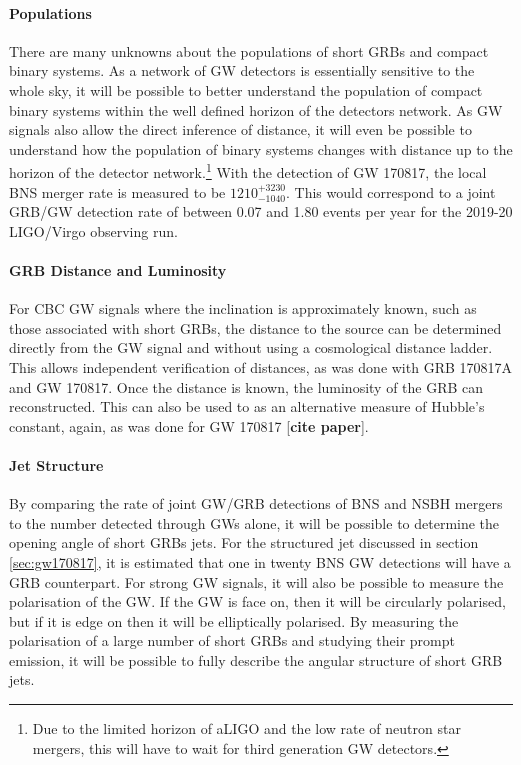 \documentclass[11pt]{cuthesis}
\begin{document}
\paragraph{Populations}
There are many unknowns about the populations of short GRBs and compact binary systems. As a network of GW detectors is essentially sensitive to the whole sky, it will be possible to better understand the population of compact binary systems within the well defined horizon of the detectors network. As GW signals also allow the direct inference of distance, it will even be possible to understand how the population of binary systems changes with distance up to the horizon of the detector network.\footnote{Due to the limited horizon of aLIGO and the low rate of neutron star mergers, this will have to wait for third generation GW detectors.} With the detection of GW 170817, the local BNS merger rate is measured to be $1210^{+3230}_{-1040}$.\cite{catalog} This would correspond to a joint GRB/GW detection rate of between 0.07 and 1.80 events per year for the 2019-20 LIGO/Virgo observing run.\cite{GW170817_GRB} 

\paragraph{GRB Distance and Luminosity}
For CBC GW signals where the inclination is approximately known, such as those associated with short GRBs, the distance to the source can be determined directly from the GW signal and without using a cosmological distance ladder. This allows independent verification of distances, as was done with GRB 170817A and GW 170817. Once the distance is known, the luminosity of the GRB can reconstructed. This can also be used to as an alternative measure of Hubble's constant, again, as was done for GW 170817 [\textbf{cite paper}]. 

\paragraph{Jet Structure}
By comparing the rate of joint GW/GRB detections of BNS and NSBH mergers to the number detected through GWs alone, it will be possible to determine the opening angle of short GRBs jets. For the structured jet discussed in section \ref{sec:gw170817}, it is estimated that one in twenty BNS GW detections will have a GRB counterpart\cite{Lazzati_afterglow}. For strong GW signals, it will also be possible to measure the polarisation of the GW. If the GW is face on, then it will be circularly polarised, but if it is edge on then it will be elliptically polarised. By measuring the polarisation of a large number of short GRBs and studying their prompt emission, it will be possible to fully describe the angular structure of short GRB jets. 
\end{document}
